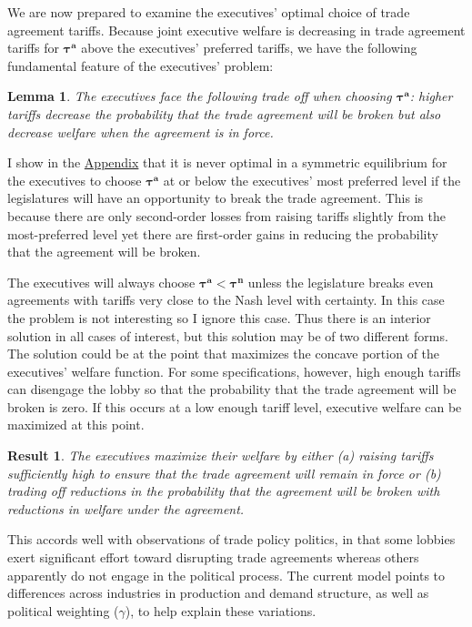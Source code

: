 \documentclass[10pt]{article}
\newtheorem{lemma}{Lemma}
\newtheorem{result}{Result}
\newcommand{\bta}{\bm{\tau^a}}
\newcommand{\btn}{\bm{\tau^n}}
\newcommand{\ga}{\gamma}
\begin{document}
We are now prepared to examine the executives' optimal choice of trade agreement tariffs. Because joint executive welfare is decreasing in trade agreement tariffs for $\bta$ above the executives' preferred tariffs, we have the following fundamental feature of the executives' problem:
\begin{lemma}
  The executives face the following trade off when choosing $\bta$: higher tariffs decrease the probability that the trade agreement will be broken but also decrease welfare when the agreement is in force.
  \label{res:to}
\end{lemma}
I show in the \hyperlink{int_soln}{Appendix} that it is never optimal in a symmetric equilibrium for the executives to choose $\bm{\tau^a}$ at or below the executives' most preferred level if the legislatures will have an opportunity to break the trade agreement. This is because there are only second-order losses from raising tariffs slightly from the most-preferred level yet there are first-order gains in reducing the probability that the agreement will be broken.

The executives will always choose $\bta < \btn$ unless the legislature breaks even agreements with tariffs very close to the Nash level with certainty. In this case the problem is not interesting so I ignore this case. Thus there is an interior solution in all cases of interest, but this solution may be of two different forms. The solution could be at the point that maximizes the concave portion of the executives' welfare function. For some specifications, however, high enough tariffs can disengage the lobby so that the probability that the trade agreement will be broken is zero. If this occurs at a low enough tariff level, executive welfare can be maximized at this point. 
\begin{result}
  The executives maximize their welfare by either (a) raising tariffs sufficiently high to ensure that the trade agreement will remain in force or (b) trading off reductions in the probability that the agreement will be broken with reductions in welfare under the agreement.
  \label{res:execsoln}
\end{result}
This accords well with observations of trade policy politics, in that some lobbies exert significant effort toward disrupting trade agreements whereas others apparently do not engage in the political process. The current model points to differences across industries in production and demand structure, as well as political weighting ($\ga$), to help explain these variations.
\end{document}
